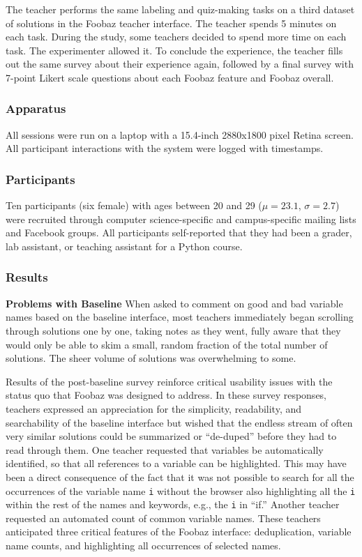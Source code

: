 The teacher performs the same labeling and quiz-making tasks on a third dataset of solutions in the Foobaz teacher interface. The teacher spends 5 minutes on each task. During the study, some teachers decided to spend more time on each task. The experimenter allowed it. To conclude the experience, the teacher fills out the same survey about their experience again, followed by a final survey with 7-point Likert scale questions about each Foobaz feature and Foobaz overall.

\subsubsection{Apparatus}

All sessions were run on a laptop with a 15.4-inch 2880x1800 pixel Retina screen. All participant interactions with the system were logged with timestamps.

\subsubsection{Participants}

Ten participants (six female) with ages between 20 and 29 ($\mu=23.1$, $\sigma=2.7$) were recruited through computer science-specific and campus-specific mailing lists and Facebook groups. All participants self-reported that they had been a grader, lab assistant, or teaching assistant for a Python course. 

\subsubsection{Results}

\textbf{Problems with Baseline} When asked to comment on good and bad variable names based on the baseline interface, most teachers immediately began scrolling through solutions one by one, taking notes as they went, fully aware that they would only be able to skim a small, random fraction of the total number of solutions. The sheer volume of solutions was overwhelming to some. 

Results of the post-baseline survey reinforce critical usability issues with the status quo that Foobaz was designed to address. In these survey responses, teachers expressed an appreciation for the simplicity, readability, and searchability of the baseline interface but wished that the endless stream of often very similar solutions could be summarized or ``de-duped'' before they had to read through them. One teacher requested that variables be automatically identified, so that all references to a variable can be highlighted. This may have been a direct consequence of the fact that it was not possible to search for all the occurrences of the variable name \texttt{i} without the browser also highlighting all the \texttt{i} within the rest of the names and keywords, e.g., the \texttt{i} in ``if.'' Another teacher requested an automated count of common variable names. These teachers anticipated three critical features of the Foobaz interface: deduplication, variable name counts, and highlighting all occurrences of selected names.

